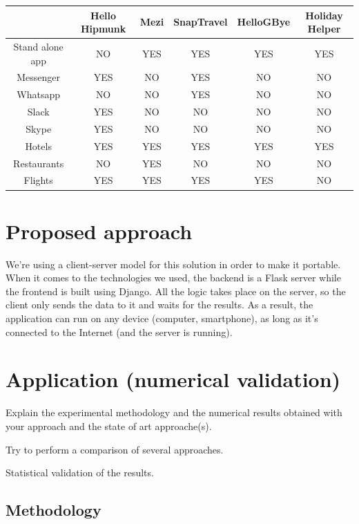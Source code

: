 \documentclass[runningheads,a4paper,11pt]{report}
\begin{document}
\begin{table}[h]
	\centering
	\begin{tabular}{|c|c|c|c|c|c|}
		\hline
		& Hello Hipmunk & Mezi & SnapTravel & HelloGBye & Holiday Helper \\ \hline
		Stand alone app & NO & YES & YES & YES & YES \\ \hline
		Messenger & YES & NO & {\color[HTML]{333333} YES} &  NO & NO \\ \hline
		Whatsapp & NO & NO & YES & NO & NO \\ \hline
		Slack & YES & NO & NO & NO & NO \\ \hline
		Skype & YES & NO & NO & NO & NO \\ \hline
		Hotels & YES & YES & YES & YES & YES \\ \hline
		Restaurants & NO & YES & NO & NO & NO \\ \hline
		Flights & YES & YES & YES & YES & NO \\ \hline
	\end{tabular}
\end{table}


\chapter{Proposed approach}
\label{chapter:proposedApproach}

We're using a client-server model for this solution in order to make it portable. When it comes to the technologies we used, the backend is a Flask server while the frontend is built using Django. All the logic takes place on the server, so the client only sends the data to it and waits for the results. As a result, the application can run on any device (computer, smartphone), as long as it's connected to the Internet (and the server is running).


\chapter{Application (numerical validation)}
\label{chapter:application}


Explain the experimental methodology and the numerical results obtained with your approach and the state of art approache(s).

Try to perform a comparison of several approaches.

Statistical validation of the results.


\section{Methodology}
\label{section:methodology}
\end{document}

